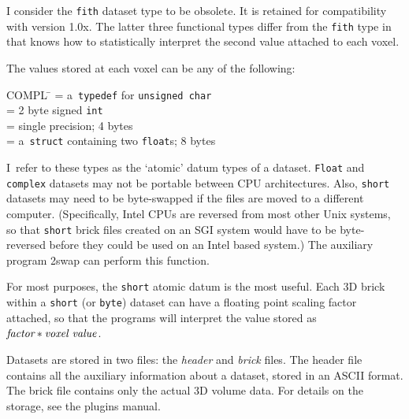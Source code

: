 I consider the {\tt fith} dataset type to be obsolete.  It is retained
for compatibility with \afnit version 1.0x.  The latter three functional
types differ from the {\tt fith} type in that \afnit knows how to
statistically interpret the second value attached to each voxel.

The
values stored at each voxel can be any of the following:
\begin{tabbing}
  \blob\blob COMPL      \= \kill
  \blob{}    \> = a~{\tt typedef} for {\tt unsigned char}  \\
  \blob{}   \> = 2 byte signed {\tt int}  \\
  \blob{}   \> = single precision; 4 bytes  \\
  \blob{} \> = a~{\tt struct} containing two {\tt float}s; 8 bytes
\end{tabbing}
I~refer to these types as the `atomic' datum types of a dataset.
{\tt Float} and {\tt complex} datasets may not be portable
between CPU architectures.  Also, {\tt short} datasets may need to be
byte-swapped if the files are moved to a different computer.
(Specifically,
Intel CPUs are reversed from most other Unix systems, so that
{\tt short} brick files created on an SGI system would have to be
byte-reversed before they could be used on an Intel based system.)
The auxiliary program {\sf 2swap} can perform this function.

For most purposes, the {\tt short} atomic datum is the most useful.
Each 3D brick within a {\tt short} (or {\tt byte}) dataset
can have a floating point scaling factor attached, so that the
\afnit programs will interpret the value stored as
${\hbox{\it factor} * \hbox{\it voxel value}}$.

Datasets are stored in two files: the {\it header\/} and {\it brick\/} files.
The header file contains all the auxiliary information about a dataset,
stored in an ASCII format.
The brick file contains only the actual 3D volume data.
For details on the storage, see the \afnit plugins manual.

